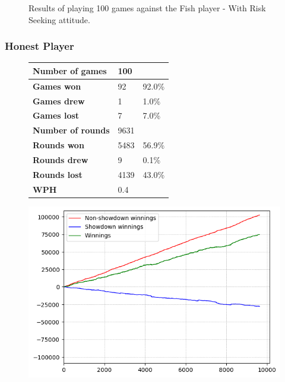 \begin{figure}[H]
\begin{minipage}{\textwidth}
\begin{minipage}{0.5\textwidth}
        \end{minipage}
    \end{minipage}
    \caption{Results of playing 100 games against the Fish player - With Risk Seeking attitude.}
    \label{fig:results_seeking_fish}
\end{figure}


\subsubsection{Honest Player}

\begin{figure}[H]
    \centering
    \begin{minipage}{\textwidth}
        \begin{minipage}{0.40\textwidth}
            \begin{tabular}{|l|l|l|}
                \hline
                \textbf{Number of games}  & 100   &        \\ \hline
                \textbf{Games won}        & 92    & 92.0\% \\ \hline
                \textbf{Games drew}       & 1     & 1.0\%  \\ \hline
                \textbf{Games lost}       & 7    & 7.0\% \\ \hline
                \textbf{Number of rounds} & 9631  &        \\ \hline
                \textbf{Rounds won}       & 5483   & 56.9\%  \\ \hline
                \textbf{Rounds drew}      & 9     & 0.1\%  \\ \hline
                \textbf{Rounds lost}      & 4139  & 43.0\% \\ \hline
                \textbf{WPH}              & 0.4 &        \\ \hline
            \end{tabular}
        \end{minipage}
        \hspace{0.05\textwidth}
        \begin{minipage}{0.5\textwidth}
            \includegraphics[width=\textwidth]{graphics/risk-seeking/honest.png}

\end{minipage}
\end{minipage}
\end{figure}

